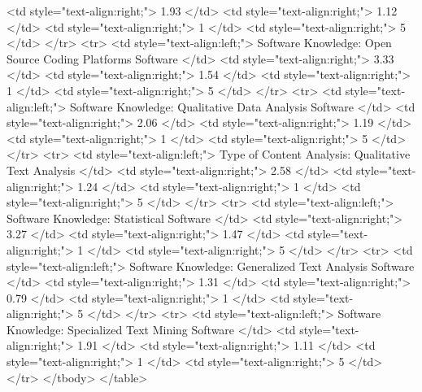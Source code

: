    <td style="text-align:right;"> 1.93 </td>
   <td style="text-align:right;"> 1.12 </td>
   <td style="text-align:right;"> 1 </td>
   <td style="text-align:right;"> 5 </td>
  </tr>
  <tr>
   <td style="text-align:left;"> Software Knowledge: Open Source Coding Platforms Software </td>
   <td style="text-align:right;"> 3.33 </td>
   <td style="text-align:right;"> 1.54 </td>
   <td style="text-align:right;"> 1 </td>
   <td style="text-align:right;"> 5 </td>
  </tr>
  <tr>
   <td style="text-align:left;"> Software Knowledge: Qualitative Data Analysis Software </td>
   <td style="text-align:right;"> 2.06 </td>
   <td style="text-align:right;"> 1.19 </td>
   <td style="text-align:right;"> 1 </td>
   <td style="text-align:right;"> 5 </td>
  </tr>
  <tr>
   <td style="text-align:left;"> Type of Content Analysis: Qualitative Text Analysis </td>
   <td style="text-align:right;"> 2.58 </td>
   <td style="text-align:right;"> 1.24 </td>
   <td style="text-align:right;"> 1 </td>
   <td style="text-align:right;"> 5 </td>
  </tr>
  <tr>
   <td style="text-align:left;"> Software Knowledge: Statistical Software </td>
   <td style="text-align:right;"> 3.27 </td>
   <td style="text-align:right;"> 1.47 </td>
   <td style="text-align:right;"> 1 </td>
   <td style="text-align:right;"> 5 </td>
  </tr>
  <tr>
   <td style="text-align:left;"> Software Knowledge: Generalized Text Analysis Software </td>
   <td style="text-align:right;"> 1.31 </td>
   <td style="text-align:right;"> 0.79 </td>
   <td style="text-align:right;"> 1 </td>
   <td style="text-align:right;"> 5 </td>
  </tr>
  <tr>
   <td style="text-align:left;"> Software Knowledge: Specialized Text Mining Software </td>
   <td style="text-align:right;"> 1.91 </td>
   <td style="text-align:right;"> 1.11 </td>
   <td style="text-align:right;"> 1 </td>
   <td style="text-align:right;"> 5 </td>
  </tr>
</tbody>
</table>
